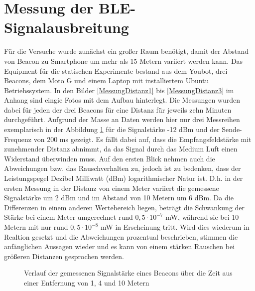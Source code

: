\section{Messung der BLE-Signalausbreitung}\label{sec:MessungBLE}
Für die Versuche wurde zunächst ein großer Raum benötigt, damit der Abstand von Beacon zu Smartphone um mehr als 15 Metern variiert werden kann. Das Equipment für die statischen Experimente bestand aus dem Youbot, drei Beacons, dem Moto G und einem Laptop mit installiertem Ubuntu Betriebssystem. In den Bilder \ref{MessungDistanz1} bis \ref{MessungDistanz3} im Anhang sind eingie Fotos mit dem Aufbau hinterlegt. Die Messungen wurden dabei für jeden der drei Beacons für eine Distanz für jeweils zehn Minuten durchgeführt. Aufgrund der Masse an Daten werden hier nur drei Messreihen exemplarisch in der Abbildung \ref{fig:MeterNormal} für die Signalstärke -12 dBm und der Sende-Frequenz von 200 ms gezeigt. Es fällt dabei auf, dass die Empfangsfeldstärke mit zunehmender Distanz abnimmt, da das Signal durch das Medium Luft einen Widerstand überwinden muss. Auf den ersten Blick nehmen auch die Abweichungen bzw. das Rauschverhalten zu, jedoch ist zu bedenken, dass der Leistungspegel Dezibel Milliwatt (dBm) logarithmischer Natur ist. D.h. in der ersten Messung in der Distanz von einem Meter variiert die gemessene Signalstärke um 2 dBm und im Abstand von 10 Metern um 6 dBm. Da die Differenzen in einem anderen Wertebereich liegen, beträgt die Schwankung der Stärke bei einem Meter umgerechnet rund $0,5 \cdot 10^{-7}$ mW, während sie bei 10 Metern mit nur rund $0,5 \cdot 10^{-8}$ mW in Erscheinung tritt. Wird dies wiederum in Realtion gesetzt und die Abweichungen prozentual beschrieben, stimmen die anfänglichen Aussagen wieder und es kann von einem stärken Rauschen bei größeren Distanzen gesprochen werden.
\begin{figure}[H] 
\centering
{}
\caption{Verlauf der gemessenen Signalstärke eines Beacons über die Zeit aus einer Entfernung von 1, 4 und 10 Metern}
\label{fig:MeterNormal}
\end{figure}
